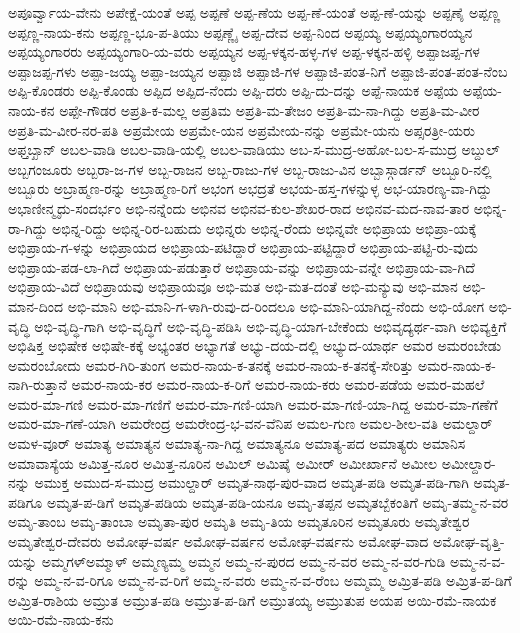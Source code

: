 ಅಪೂರ್ವ್ವಾಯ-ವೇನು
ಅಪೇಕ್ಷೆ-ಯಂತೆ
ಅಪ್ಪ
ಅಪ್ಪಣೆ
ಅಪ್ಪ-ಣೆಯ
ಅಪ್ಪ-ಣೆ-ಯಂತೆ
ಅಪ್ಪ-ಣೆ-ಯನ್ನು
ಅಪ್ಪಣೈ
ಅಪ್ಪಣ್ಣ
ಅಪ್ಪಣ್ಣ-ನಾಯ-ಕನು
ಅಪ್ಪಣ್ಣ-ಭೂ-ಪ-ತಿಯು
ಅಪ್ಪಣ್ಣೈ
ಅಪ್ಪ-ದೇವ
ಅಪ್ಪ-ನಿಂದ
ಅಪ್ಪಯ್ಯ
ಅಪ್ಪಯ್ಯಂಗಾರಯ್ಯನ
ಅಪ್ಪಯ್ಯಂಗಾರರು
ಅಪ್ಪಯ್ಯಂಗಾರಿ-ಯ-ವರು
ಅಪ್ಪಯ್ಯನ
ಅಪ್ಪ-ಳಕ್ಕನ-ಹಳ್ಳ-ಗಳ
ಅಪ್ಪ-ಳಕ್ಕನ-ಹಳ್ಳಿ
ಅಪ್ಪಾಜಪ್ಪ-ಗಳ
ಅಪ್ಪಾಜಪ್ಪ-ಗಳು
ಅಪ್ಪಾ-ಜಯ್ಯ
ಅಪ್ಪಾ-ಜಯ್ಯನ
ಅಪ್ಪಾಜಿ
ಅಪ್ಪಾಜಿ-ಗಳ
ಅಪ್ಪಾಜಿ-ಪಂತ-ನಿಗೆ
ಅಪ್ಪಾಜಿ-ಪಂತ-ಪಂತ-ನೆಂಬ
ಅಪ್ಪಿ-ಕೊಂಡರು
ಅಪ್ಪಿ-ಕೊಂಡು
ಅಪ್ಪಿದ
ಅಪ್ಪಿದ-ನೆಂದು
ಅಪ್ಪಿ-ದರು
ಅಪ್ಪಿ-ದು-ದನ್ನು
ಅಪ್ಪೆ-ನಾಯಕ
ಅಪ್ಪೆಯ
ಅಪ್ಪೆಯ-ನಾಯ-ಕನ
ಅಪ್ಪೇ-ಗೌಡರ
ಅಪ್ರತಿ-ಕ-ಮಲ್ಲ
ಅಪ್ರತಿಮ
ಅಪ್ರತಿ-ಮ-ತೇಜಂ
ಅಪ್ರತಿ-ಮ-ನಾ-ಗಿದ್ದು
ಅಪ್ರತಿ-ಮ-ವೀರ
ಅಪ್ರತಿ-ಮ-ವೀರ-ನರ-ಪತಿ
ಅಪ್ರಮೇಯ
ಅಪ್ರಮೇ-ಯನ
ಅಪ್ರಮೇಯ-ನನ್ನು
ಅಪ್ರಮೇ-ಯನು
ಅಪ್ಸರತ್ರೀ-ಯರು
ಅಫ್ತಬ್ಖಾನ್
ಅಬಲ-ವಾಡಿ
ಅಬಲ-ವಾಡಿ-ಯಲ್ಲಿ
ಅಬಲ-ವಾಡಿಯು
ಅಬ-ಸ-ಮುದ್ರ-ಅಹೋ-ಬಲ-ಸ-ಮುದ್ರ
ಅಬ್ದುಲ್
ಅಬ್ಬಗಂಜೂರು
ಅಬ್ಬರಾ-ಜ-ಗಳ
ಅಬ್ಬ-ರಾಜನ
ಅಬ್ಬ-ರಾಜು-ಗಳ
ಅಬ್ಬ-ರಾಜು-ವಿನ
ಅಬ್ಬಾಸ್ಗಾರ್ಡನ್
ಅಬ್ಬೂರಿ-ನಲ್ಲಿ
ಅಬ್ಬೂರು
ಅಬ್ರಾಹ್ಮಣ-ರನ್ನು
ಅಬ್ರಾಹ್ಮಣ-ರಿಗೆ
ಅಭಂಗ
ಅಭದ್ರತೆ
ಅಭಯ-ಹಸ್ತ-ಗಳನ್ನುಳ್ಳ
ಅಭ-ಯಾರಣ್ಯ-ವಾ-ಗಿದ್ದು
ಅಭಾಣೀನ್ಮೃದು-ಸಂದರ್ಭಂ
ಅಭಿ-ನನ್ನೆಂದು
ಅಭಿನವ
ಅಭಿನವ-ಕುಲ-ಶೇಖರ-ರಾದ
ಅಭಿನವ-ಮದ-ನಾವ-ತಾರ
ಅಭಿನ್ನ-ರಾ-ಗಿದ್ದು
ಅಭಿನ್ನ-ರಿದ್ದು
ಅಭಿನ್ನ-ರಿರ-ಬಹುದು
ಅಭಿನ್ನರು
ಅಭಿನ್ನ-ರೆಂದು
ಅಭಿನ್ನವೇ
ಅಭಿಪ್ರಾಯ
ಅಭಿಪ್ರಾ-ಯಕ್ಕೆ
ಅಭಿಪ್ರಾಯ-ಗ-ಳನ್ನು
ಅಭಿಪ್ರಾಯದ
ಅಭಿಪ್ರಾಯ-ಪಟಿದ್ದಾರೆ
ಅಭಿಪ್ರಾಯ-ಪಟ್ಟಿದ್ದಾರೆ
ಅಭಿಪ್ರಾಯ-ಪಟ್ಟಿ-ರು-ವುದು
ಅಭಿಪ್ರಾಯ-ಪಡ-ಲಾ-ಗಿದೆ
ಅಭಿಪ್ರಾಯ-ಪಡುತ್ತಾರೆ
ಅಭಿಪ್ರಾಯ-ವನ್ನು
ಅಭಿಪ್ರಾಯ-ವನ್ನೇ
ಅಭಿಪ್ರಾಯ-ವಾ-ಗಿದೆ
ಅಭಿಪ್ರಾಯ-ವಿದೆ
ಅಭಿಪ್ರಾಯವು
ಅಭಿಪ್ರಾಯವೂ
ಅಭಿ-ಮತ
ಅಭಿ-ಮತ-ದಂತೆ
ಅಭಿ-ಮನ್ಯುವು
ಅಭಿ-ಮಾನ
ಅಭಿ-ಮಾನ-ದಿಂದ
ಅಭಿ-ಮಾನಿ
ಅಭಿ-ಮಾನಿ-ಗ-ಳಾಗಿ-ರುವು-ದ-ರಿಂದಲೂ
ಅಭಿ-ಮಾನಿ-ಯಾಗಿದ್ದ-ನೆಂದು
ಅಭಿ-ಯೋಗ
ಅಭಿ-ವೃದ್ಧಿ
ಅಭಿ-ವೃದ್ಧಿ-ಗಾಗಿ
ಅಭಿ-ವೃದ್ಧಿಗೆ
ಅಭಿ-ವೃದ್ಧಿ-ಪಡಿಸಿ
ಅಭಿ-ವೃದ್ಧಿ-ಯಾಗ-ಬೇಕೆಂದು
ಅಭಿವೃದ್ಯರ್ಥ-ವಾಗಿ
ಅಭಿವ್ಯಕ್ತಿಗೆ
ಅಭಿಷಿಕ್ತ
ಅಭಿಷೇಕ
ಅಭಿಷೇ-ಕಕ್ಕೆ
ಅಭ್ಯಂತರ
ಅಭ್ಯಾಗತೆ
ಅಭ್ಯು-ದಯ-ದಲ್ಲಿ
ಅಭ್ಯುದ-ಯಾರ್ಥ
ಅಮರ
ಅಮರಂಬೇಡು
ಅಮರಂಬೋದು
ಅಮರ-ಗಿರಿ-ತುಂಗ
ಅಮರ-ನಾಯ-ಕ-ತನಕ್ಕೆ
ಅಮರ-ನಾಯ-ಕ-ತನಕ್ಕೆ-ಸೇರಿತ್ತು
ಅಮರ-ನಾಯ-ಕ-ನಾಗಿ-ರುತ್ತಾನೆ
ಅಮರ-ನಾಯ-ಕರ
ಅಮರ-ನಾಯ-ಕ-ರಿಗೆ
ಅಮರ-ನಾಯ-ಕರು
ಅಮರ-ಪಡೆಯ
ಅಮರ-ಮಹಲೆ
ಅಮರ-ಮಾ-ಗಣಿ
ಅಮರ-ಮಾ-ಗಣಿಗೆ
ಅಮರ-ಮಾ-ಗಣಿ-ಯಾಗಿ
ಅಮರ-ಮಾ-ಗಣಿ-ಯಾ-ಗಿದ್ದ
ಅಮರ-ಮಾ-ಗಣೆಗೆ
ಅಮರ-ಮಾ-ಗಣೆ-ಯಾಗಿ
ಅಮರೇಂದ್ರ
ಅಮರೇಂದ್ರ-ಭ-ವನ-ವೆನಿಪ
ಅಮಲ-ಗುಣ
ಅಮಲ-ಶೀಲ-ವತಿ
ಅಮಲ್ದಾರ್
ಅಮಳ-ವೂರ್
ಅಮಾತ್ಯ
ಅಮಾತ್ಯನ
ಅಮಾತ್ಯ-ನಾ-ಗಿದ್ದ
ಅಮಾತ್ಯನೂ
ಅಮಾತ್ಯ-ಪದ
ಅಮಾತ್ಯರು
ಅಮಾನಿಸ
ಅಮಾವಾಸ್ಯೆಯ
ಅಮಿತ್ತ-ನೂರ
ಅಮಿತ್ತ-ನೂರಿನ
ಅಮಿಲ್
ಅಮಿಷೈ
ಅಮೀರ್
ಅಮೀರ್ಖಾನೆ
ಅಮೀಲ
ಅಮೀಲ್ದಾರ-ನನ್ನು
ಅಮುಕ್ತ
ಅಮುದ-ಸ-ಮುದ್ರ
ಅಮುಲ್ದಾರ್
ಅಮೃತ-ನಾಥ-ಪುರ-ವಾದ
ಅಮೃತ-ಪಡಿ
ಅಮೃತ-ಪಡಿ-ಗಾಗಿ
ಅಮೃತ-ಪಡಿಗೂ
ಅಮೃತ-ಪ-ಡಿಗೆ
ಅಮೃತ-ಪಡಿಯ
ಅಮೃತ-ಪಡಿ-ಯನೂ
ಅಮೃ-ತಪ್ಪನ
ಅಮೃತಬ್ಬೆಕಂತಿಗೆ
ಅಮೃ-ತಮ್ಮ-ನ-ವರ
ಅಮೃ-ತಾಂಬ
ಅಮೃ-ತಾಂಬಾ
ಅಮೃತಾ-ಪುರ
ಅಮೃತಿ
ಅಮೃ-ತಿಯ
ಅಮೃತೂರಿನ
ಅಮೃತೂರು
ಅಮೃತೇಶ್ವರ
ಅಮೃತೇಶ್ವರ-ದೇವರು
ಅಮೋಘ-ವರ್ಷ
ಅಮೋಘ-ವರ್ಷನ
ಅಮೋಘ-ವರ್ಷನು
ಅಮೋಘ-ವಾದ
ಅಮೋಘ-ವೃತ್ತಿ-ಯನ್ನು
ಅಮ್ಮಗಳ್ಅಮ್ಮಾಳ್
ಅಮ್ಮಣ್ಯಮ್ಮ
ಅಮ್ಮನ
ಅಮ್ಮ-ನ-ಪುರದ
ಅಮ್ಮ-ನ-ವರ
ಅಮ್ಮ-ನ-ವರ-ಗುಡಿ
ಅಮ್ಮ-ನ-ವ-ರನ್ನು
ಅಮ್ಮ-ನ-ವ-ರಿಗೂ
ಅಮ್ಮ-ನ-ವ-ರಿಗೆ
ಅಮ್ಮ-ನ-ವರು
ಅಮ್ಮ-ನ-ವ-ರೆಂಬ
ಅಮ್ಮಮ್ಮ
ಅಮ್ರಿತ-ಪಡಿ
ಅಮ್ರಿತ-ಪ-ಡಿಗೆ
ಅಮ್ರಿತ-ರಾಶಿಯ
ಅಮ್ರುತ
ಅಮ್ರುತ-ಪಡಿ
ಅಮ್ರುತ-ಪ-ಡಿಗೆ
ಅಮ್ರುತಯ್ಯ
ಅಮ್ರುತುಪ
ಅಯಪ
ಅಯಿ-ರಮೆ-ನಾಯಕ
ಅಯಿ-ರಮೆ-ನಾಯ-ಕನು
